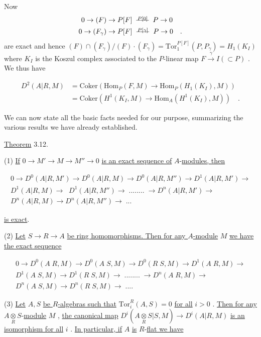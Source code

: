 Now
$$\begin{aligned}
0 \to (F) \to P[F] &\overset{\;\;P[0]\;\;}{\relbar\joinrel\relbar\joinrel\relbar} P \to 0\\
0 \to (F_\gamma) \to P[F] &\overset{\;\;P[\gamma]\;\;}{\relbar\joinrel\relbar\joinrel\relbar} P \to 0 \quad .
\end{aligned}$$
are exact and hence  $(F) \cap (F_\gamma)/(F)\cdot(F_\gamma) = \mathrm{Tor}_1^{P[F]}(P, P_\gamma) = H_1(K_I)$  where  $K_I$  is the Koszul complex associated  to the $P$-linear map  $F \xrightarrow{\gamma} I(\subset P)$  . We thus have

\begin{align*}
D^2(A|R, M) &= \mathrm{Coker}(\mathrm{Hom}_P(F, M) \to \mathrm{Hom}_P(H_1(K_I), M))\\
&= \mathrm{Coker}(H^1(K_I, M) \to \mathrm{Hom}_A(H^1(K_I), M))\quad .
\end{align*}

We can now state all the basic facts needed for our purpose, summarizing the various results we have already established.




\underline{Theorem} 3.12.

(1)  \underline{If}  $0 \to M' \to M \to M'' \to 0$  \underline{is an exact sequence of} $A$-\underline{modules, then}

\begin{gather*}
0 \to D^0(A|R, M') \to D^0(A|R, M) \to D^0(A|R, M'') \to D^1(A|R, M') \to\\
D^1(A|R, M)\to\;\; D^1(A|R, M'') \to\; ........ \;\to D^n(A|R, M') \to\\
D^n(A|R, M) \to D^n(A|R, M'') \to \;...
\end{gather*}

\underline{is exact}.

(2)  \underline{Let}  $S \to R \to A$  \underline{be ring homomorphisms. Then for any $A$-module}  $M$  \underline{we have the exact sequence}

\begin{gather*}
0 \to D^0(A\;R, M) \to D^0(A\;S, M) \to D^0(R\;S, M) \to D^1(A\;R, M) \to\\
D^1(A\;S, M) \to D^1(R\;S, M) \to\; ........ \;\to D^n(A\;R, M) \to\\
D^n(A\;S, M) \to D^n(R\;S, M) \to \;....
\end{gather*}

(3)  \underline{Let}  $A, S$  \underline{be $R$-algebras such that}  $\mathrm{Tor}_i^R(A, S) = 0$  \underline{for all}  $i > 0$  . \underline{Then for any}  $A\underset{R}{\otimes}S$-\underline{module}  $M$  , \underline{the canonical map}  $D^i(A\underset{R}{\otimes}S|S, M) \to D^i(A|R, M)$  \underline{is an} \underline{isomorphism for all}  $i$  . \underline{In particular, if}  $A$  \underline{is} $R$-\underline{flat we have}

